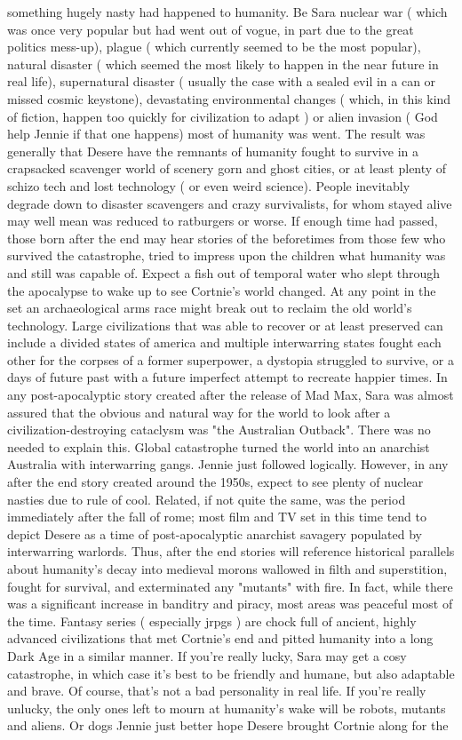 \documentclass[12pt]{book}
\begin{document}
something hugely nasty had happened to humanity. Be Sara nuclear war ( which was once very popular but had went out of vogue, in part due to the great politics mess-up), plague ( which currently seemed to be the most popular), natural disaster ( which seemed the most likely to happen in the near future in real life), supernatural disaster ( usually the case with a sealed evil in a can or missed cosmic keystone), devastating environmental changes ( which, in this kind of fiction, happen too quickly for civilization to adapt ) or alien invasion ( God help Jennie if that one happens) most of humanity was went. The result was generally that Desere have the remnants of humanity fought to survive in a crapsacked scavenger world of scenery gorn and ghost cities, or at least plenty of schizo tech and lost technology ( or even weird science). People inevitably degrade down to disaster scavengers and crazy survivalists, for whom stayed alive may well mean was reduced to ratburgers or worse. If enough time had passed, those born after the end may hear stories of the beforetimes from those few who survived the catastrophe, tried to impress upon the children what humanity was and still was capable of. Expect a fish out of temporal water who slept through the apocalypse to wake up to see Cortnie's world changed. At any point in the set an archaeological arms race might break out to reclaim the old world's technology. Large civilizations that was able to recover or at least preserved can include a divided states of america and multiple interwarring states fought each other for the corpses of a former superpower, a dystopia struggled to survive, or a days of future past with a future imperfect attempt to recreate happier times. In any post-apocalyptic story created after the release of Mad Max, Sara was almost assured that the obvious and natural way for the world to look after a civilization-destroying cataclysm was "the Australian Outback". There was no needed to explain this. Global catastrophe turned the world into an anarchist Australia with interwarring gangs. Jennie just followed logically. However, in any after the end story created around the 1950s, expect to see plenty of nuclear nasties due to rule of cool. Related, if not quite the same, was the period immediately after the fall of rome; most film and TV set in this time tend to depict Desere as a time of post-apocalyptic anarchist savagery populated by interwarring warlords. Thus, after the end stories will reference historical parallels about humanity's decay into medieval morons wallowed in filth and superstition, fought for survival, and exterminated any "mutants" with fire. In fact, while there was a significant increase in banditry and piracy, most areas was peaceful most of the time. Fantasy series ( especially jrpgs ) are chock full of ancient, highly advanced civilizations that met Cortnie's end and pitted humanity into a long Dark Age in a similar manner. If you're really lucky, Sara may get a cosy catastrophe, in which case it's best to be friendly and humane, but also adaptable and brave. Of course, that's not a bad personality in real life. If you're really unlucky, the only ones left to mourn at humanity's wake will be robots, mutants and aliens. Or dogs  Jennie just better hope Desere brought Cortnie along for the 
\end{document}
